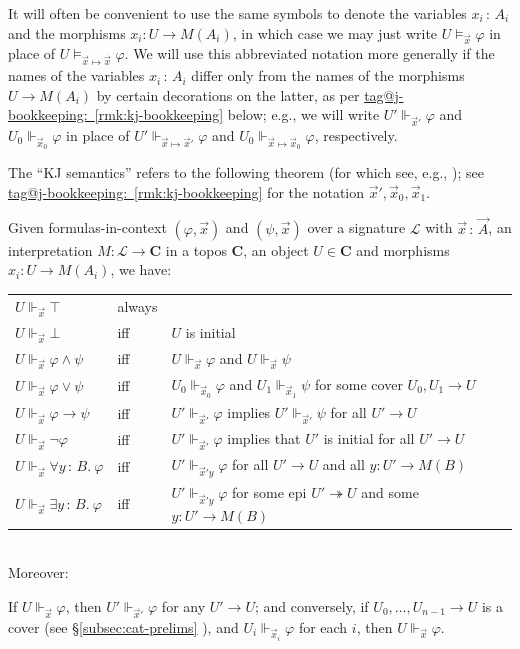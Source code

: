 \documentclass{amsart}
\makeatletter
\newcommand\bC{\mathbf{C}}
\newcommand\cL{\mathcal{L}}
\renewcommand\phi{\varphi}
\newcommand\tolon{{\,:\,}}
\newcommand\too{\twoheadrightarrow}
\newcommand\vA{\vek{A}}
\newcommand\vek[1]{{\vec{#1}}}
\newcommand\vx{\vek{x}}
\newcommand\tagword[1]{\csname tag@#1\endcsname}
\def\label@tag#1:#2\@nil{#1}
\newcommand\labeltag[1]{\label@tag#1:\@nil}
\newcommand\jref[1]{%
  \texorpdfstring%
    {\hyperref[#1]{\tagword{\labeltag{#1}}~\ref*{#1}}}%
    {\tagword{\labeltag{#1}}~\ref*{#1}}%
}
\newcommand\prerefpost[3]{%
  \texorpdfstring%
    {\hyperref[#2]{#1\ref*{#2}#3}}%
    {#1\ref*{#2}#3}%
}
\newcommand\sref[1]{\prerefpost{\S}{#1}{}}
\theoremstyle{definition}
\theoremstyle{remark}
\theoremstyle{plainwithref}
\makeatother
\begin{document}
It will often be convenient to use the same symbols to denote the variables \( x_i \tolon A_i \) and the morphisms \( x_i \colon U \to M(A_i) \), in which case we may just write \( U \vDash_{\vx} \phi \) in place of \( U \vDash_{\vx \mapsto \vx} \phi \).
We will use this abbreviated notation more generally if the names of the variables \( x_i \tolon A_i \) differ only from the names of the morphisms \( U \to M(A_i) \) by certain decorations on the latter, as per \jref{rmk:kj-bookkeeping} below; e.g., we will write \( U' \Vdash_{\vx'} \phi \) and \( U_0 \Vdash_{\vx_0} \phi \) in place of \( U' \Vdash_{\vx \mapsto \vx'} \phi \) and \( U_0 \Vdash_{\vx \mapsto \vx_0} \phi \), respectively.

The ``KJ semantics'' refers to the following theorem (for which see, e.g., \cite[\S\S VI.6-7]{mac-lane-moerdijk}); see \jref{rmk:kj-bookkeeping} for the notation \( \vx', \vx_0, \vx_1 \).
\begin{thm} \label{thm:kj-semantics}
  Given formulas-in-context \( (\phi, \vx) \) and \( (\psi,\vx) \) over a signature \( \cL \) with \( \vx \tolon \vA \), an interpretation \( M \colon \cL \to \bC \) in a topos \( \bC \), an object \( U \in \bC \) and morphisms \( x_i \colon U \to M(A_i) \), we have:

  \begin{tabular}{lll}
    \( U \Vdash_\vx \top \) & always & \\
    \( U \Vdash_\vx \bot \) & iff & \( U \) is initial \\
    \( U \Vdash_\vx \phi \wedge \psi \) & iff & \( U \Vdash_{\vx} \phi \) and \( U \Vdash_{\vx} \psi \) \\
    \( U \Vdash_\vx \phi \vee \psi \) & iff & \( U_0 \Vdash_{\vx_0} \phi \) and \( U_1 \Vdash_{\vx_1} \psi \) for some cover \( U_0,U_1 \to U \) \\
    \( U \Vdash_\vx \phi \to \psi \) & iff & \( U' \Vdash_{\vx'} \phi \) implies \( U' \Vdash_{\vx'} \psi \) for all \( U' \to U \) \\
    \( U \Vdash_\vx \neg \phi \) & iff & \( U' \Vdash_{\vx'} \phi \) implies that \( U' \) is initial for all \( U' \to U \) \\
    \( U \Vdash_\vx \forall y \tolon B.\ \phi \) & iff & \( U' \Vdash_{\vx' y} \phi \) for all \( U' \to U \) and all \( y \colon U' \to M(B) \) \\
    \( U \Vdash_\vx \exists y \tolon B.\ \phi \) & iff & \( U' \Vdash_{\vx' y} \phi \)  for some epi \( U' \too U \) and some \( y \colon U' \to M(B) \)
  \end{tabular}\\

  Moreover:

  If \( U \Vdash_\vx \phi \), then \( U' \Vdash_{\vx'} \phi \) for any \( U' \to U \);
  and conversely, if \( U_0, \ldots ,U_{n - 1} \to U \) is a cover (see \sref{subsec:cat-prelims}), and \( U_i \Vdash_{\vx_i} \phi \) for each \( i \), then \( U \Vdash_{\vx} \phi \).
\end{thm}
\end{document}
